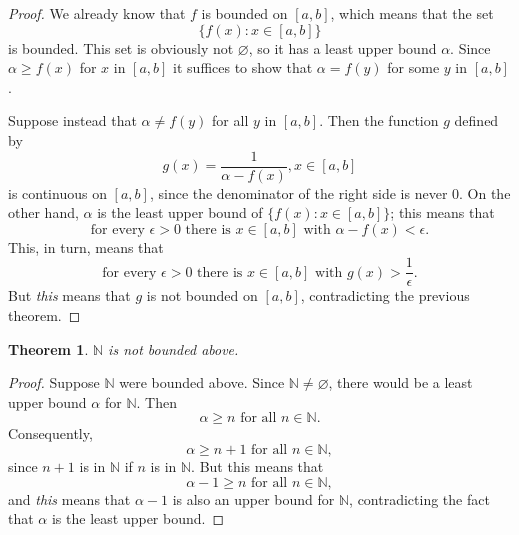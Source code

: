 \documentclass{article}
\newtheorem{theorem}{Theorem}
\begin{document}
\begin{proof}
  We already know that $f$ is bounded on $[a, b]$, which means that the set
  \begin{equation*}
    \{f(x): x \in [a, b]\}
  \end{equation*} is bounded. This set is obviously not $\varnothing$, so it
  has a least upper bound $\alpha$. Since $\alpha \geq f(x)$ for $x$ in $[a,
  b]$ it suffices to show that $\alpha = f(y)$ for some $y$ in $[a, b]$.

  Suppose instead that $\alpha \neq f(y)$ for all $y$ in $[a, b]$. Then the
  function $g$ defined by \begin{equation*}
    g(x) = \frac{1}{\alpha - f(x)}, x \in [a, b]
  \end{equation*} is continuous on $[a, b]$, since the denominator of the right
  side is never 0. On the other hand, $\alpha$ is the least upper bound of
  $\{f(x): x \in [a, b]\}$; this means that \begin{equation*}
    \text{for every } \epsilon > 0 \text{ there is } x \in [a, b] \text{ with }
      \alpha - f(x) < \epsilon.
  \end{equation*}
  This, in turn, means that \begin{equation*}
    \text{for every } \epsilon > 0 \text{ there is } x \in [a, b] \text{ with }
      g(x) > \frac{1}{\epsilon}.
  \end{equation*}
  But \emph{this} means that $g$ is not bounded on $[a, b]$, contradicting the
  previous theorem.
\end{proof}

\begin{theorem}
  $\mathbb{N}$ is not bounded above.
\end{theorem}

\begin{proof}
  Suppose $\mathbb{N}$ were bounded above. Since $\mathbb{N} \neq \varnothing$,
  there would be a least upper bound $\alpha$ for $\mathbb{N}$. Then
  \begin{equation*}
    \alpha \geq n \text{ for all } n \in \mathbb{N}.
  \end{equation*}
  Consequently, \begin{equation*}
    \alpha \geq n + 1 \text{ for all } n \in \mathbb{N},
  \end{equation*} since $n + 1$ is in $\mathbb{N}$ if $n$ is in $\mathbb{N}$.
  But this means that \begin{equation*}
    \alpha - 1 \geq n \text{ for all } n \in \mathbb{N},
  \end{equation*} and \emph{this} means that $\alpha - 1$ is also an upper
  bound for $\mathbb{N}$, contradicting the fact that $\alpha$ is the least
  upper bound.
\end{proof}
\end{document}
